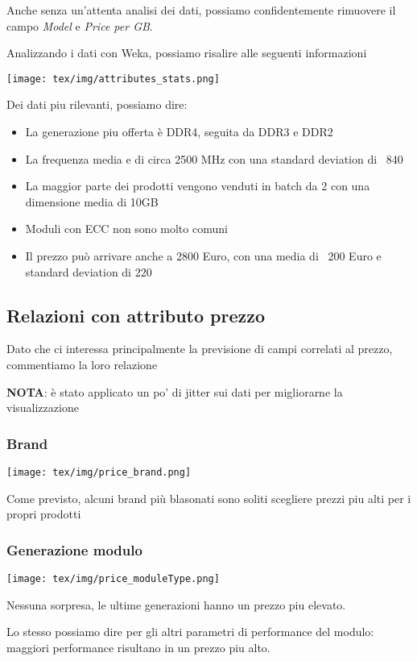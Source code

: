\documentclass[12pt]{report}
\begin{document}
Anche senza un'attenta analisi dei dati, possiamo confidentemente rimuovere il campo \textit{Model} e \textit{Price per GB}.

Analizzando i dati con Weka, possiamo risalire alle seguenti informazioni

\texttt{[image: tex/img/attributes\_stats.png]}

Dei dati piu rilevanti, possiamo dire:
\begin{itemize}
	\item La generazione piu offerta è DDR4, seguita da DDR3 e DDR2
	\item La frequenza media e di circa 2500 MHz con una standard deviation di ~840
	\item La maggior parte dei prodotti vengono venduti in batch da 2 con una dimensione media di 10GB
	\item Moduli con ECC non sono molto comuni
	\item Il prezzo può arrivare anche a 2800 Euro, con una media di ~200 Euro e standard deviation di 220
\end{itemize}

\newpage
\subsection{Relazioni con attributo prezzo}
Dato che ci interessa principalmente la previsione di campi correlati al prezzo,
commentiamo la loro relazione

\textbf{NOTA}: è stato applicato un po' di jitter sui dati per migliorarne la visualizzazione

\subsubsection{Brand}
\texttt{[image: tex/img/price\_brand.png]}

Come previsto, alcuni brand più blasonati sono soliti scegliere prezzi piu alti per i propri prodotti

\subsubsection{Generazione modulo}
\texttt{[image: tex/img/price\_moduleType.png]}

Nessuna sorpresa, le ultime generazioni hanno un prezzo piu elevato.

Lo stesso possiamo dire per gli altri parametri di performance del modulo: 
maggiori performance risultano in un prezzo piu alto.
\end{document}
